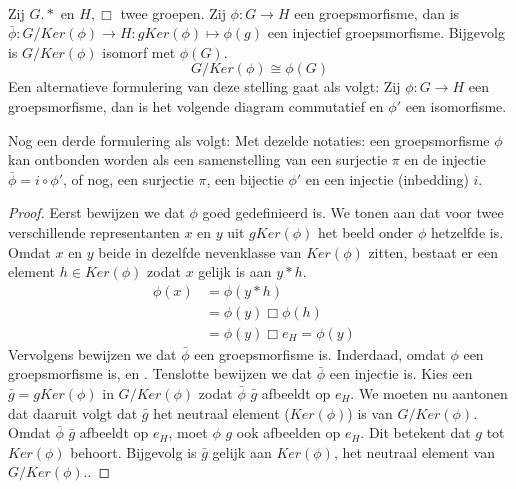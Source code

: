 \documentclass[main.tex]{subfiles}
\begin{document}
\begin{st}
  \label{st:eerste-isomorfismestelling}
  \\
  Zij $G.*$ en $H,\Box$ twee groepen.
  Zij $\phi: G \rightarrow H$ een groepsmorfisme, dan is $\bar{\phi}: G/Ker(\phi) \rightarrow H: gKer(\phi) \mapsto \phi(g)$ een injectief groepsmorfisme.
  Bijgevolg is $G/Ker(\phi)$ isomorf met $\phi(G)$. 
  \[ G/Ker(\phi) \cong \phi(G) \]
  Een alternatieve formulering van deze stelling gaat als volgt:
  Zij $\phi: G \rightarrow H$ een groepsmorfisme, dan is het volgende diagram commutatief en $\phi'$ een isomorfisme.
  \begin{figure}[H]
    \centering
  \end{figure}
  Nog een derde formulering als volgt:
  Met dezelde notaties: een groepsmorfisme $\phi$ kan ontbonden worden als een samenstelling van een surjectie $\pi$ en de injectie $\bar{\phi} = i \circ \phi'$, of nog, een surjectie $\pi$, een bijectie $\phi'$ en een injectie (inbedding) $i$.

  \begin{proof}
    Eerst bewijzen we dat $\phi$ goed gedefinieerd is. We tonen aan dat voor twee verschillende representanten $x$ en $y$ uit $gKer(\phi)$ het beeld onder $\phi$ hetzelfde is.
    Omdat $x$ en $y$ beide in dezelfde nevenklasse van $Ker(\phi)$ zitten, bestaat er een element $h\in Ker(\phi)$ zodat $x$ gelijk is aan $y*h$.
    \[
    \begin{array}{rll}
      \phi(x) &= \phi(y*h) &\\
      &= \phi(y) \Box \phi(h) &\\
      &= \phi(y) \Box e_{H} = \phi(y)
    \end{array}
    \]
    Vervolgens bewijzen we dat $\bar{\phi}$ een groepsmorfisme is.
    Inderdaad, omdat $\phi$ een groepsmorfisme is, en \waarom.
    Tenslotte bewijzen we dat $\bar{\phi}$ een injectie is.
    Kies een $\bar{g} = gKer(\phi)$ in $G/Ker(\phi)$ zodat $\bar{\phi}$ $\bar{g}$ afbeeldt op $e_{H}$.
    We moeten nu aantonen dat daaruit volgt dat $\bar{g}$ het neutraal element ($Ker(\phi)$) is van $G/Ker(\phi)$.
    Omdat $\bar{\phi}$ $\bar{g}$ afbeeldt op $e_{H}$, moet $\phi$ $g$ ook afbeelden op $e_{H}$.
    \waarom
    Dit betekent dat $g$ tot $Ker(\phi)$ behoort. Bijgevolg is $\bar{g}$ gelijk aan $Ker(\phi)$, het neutraal element van $G/Ker(\phi)$..
  \end{proof}
\end{st}
\end{document}
